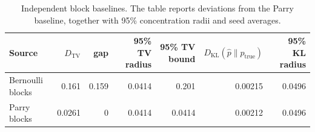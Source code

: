 \begin{table}[t]
\centering
\scriptsize
\setlength{\tabcolsep}{4pt}
\caption{Independent block baselines.  The table reports deviations from the
Parry baseline, together with 95\% concentration radii and seed averages.}
\label{tab:iid_sources_fold_vs_parry_ci}
\begin{tabular}{lrrrrrr}
\toprule
Source & $D_\mathrm{TV}$ & gap & 95\% TV radius & 95\% TV bound & $D_\mathrm{KL}(\hat p\|p_{\mathrm{true}})$ & 95\% KL radius\\
\midrule
Bernoulli blocks & 0.161 & 0.159 & 0.0414 & 0.201 & 0.00215 & 0.0496\\
Parry blocks & 0.0261 & 0 & 0.0414 & 0.0414 & 0.00212 & 0.0496\\
\bottomrule
\end{tabular}
\end{table}
